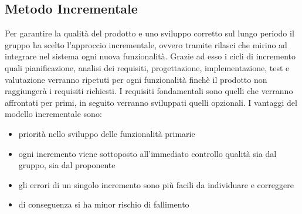 \documentclass[../piano_di_progetto.tex]{subfiles}
\begin{document}
\subsection{Metodo Incrementale}
\label{sub:incr}
Per garantire la qualità del prodotto e uno sviluppo corretto sul lungo periodo il gruppo ha scelto l’approccio incrementale, ovvero tramite rilasci che mirino ad integrare nel sistema ogni nuova funzionalità. Grazie ad esso i cicli di incremento quali pianificazione, analisi dei requisiti, progettazione, implementazione, test e valutazione verranno ripetuti per ogni funzionalità finchè il prodotto non raggiungerà i requisiti richiesti. I requisiti fondamentali sono quelli che verranno affrontati per primi, in seguito verranno sviluppati quelli opzionali.
I vantaggi del modello incrementale sono:
\begin{itemize}
\item priorità nello sviluppo delle funzionalità primarie
\item ogni incremento viene sottoposto all’immediato controllo qualità sia dal gruppo, sia dal proponente
\item gli errori di un singolo incremento sono più facili da individuare e correggere
\item di conseguenza si ha minor rischio di fallimento
\end{itemize}
\end{document}
